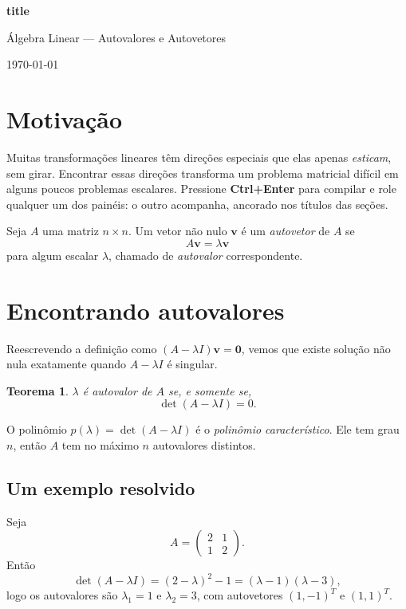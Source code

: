 \documentclass[11pt,a4paper]{article}
\theoremstyle{plain}
\newtheorem{theorem}{Teorema}[section]
\theoremstyle{remark}
\newcommand{\notesTitle}[2]{%
    \noindent{\color{accent}\rule{\linewidth}{3pt}}\par
    \vspace{1.2em}
    \begin{center}
        {\color{accentDark}\LARGE\bfseries #1}\par
        \vspace{0.5em}
        {\color{accent}\large #2}\par
        \vspace{0.4em}
        {\small \today}
    \end{center}
    \vspace{0.6em}
    \noindent{\color{accent}\rule{\linewidth}{1pt}}\par
    \vspace{1.5em}
}
\begin{document}
\notesTitle{{{title}}}{Álgebra Linear --- Autovalores e Autovetores}

\section{Motivação}

Muitas transformações lineares têm direções especiais que elas apenas \emph{esticam}, sem girar. Encontrar essas direções transforma um problema matricial difícil em alguns poucos problemas escalares. Pressione \textbf{Ctrl+Enter} para compilar e role qualquer um dos painéis: o outro acompanha, ancorado nos títulos das seções.

\begin{tcolorbox}[definitionBox, title=Definição 1.1]
Seja $A$ uma matriz $n \times n$. Um vetor não nulo $\mathbf{v}$ é um \emph{autovetor} de $A$ se
\[ A\mathbf{v} = \lambda \mathbf{v} \]
para algum escalar $\lambda$, chamado de \emph{autovalor} correspondente.
\end{tcolorbox}

\section{Encontrando autovalores}

Reescrevendo a definição como $(A - \lambda I)\mathbf{v} = \mathbf{0}$, vemos que existe solução não nula exatamente quando $A - \lambda I$ é singular.

\begin{theorem}
$\lambda$ é autovalor de $A$ se, e somente se,
\[ \det(A - \lambda I) = 0. \]
\end{theorem}

\begin{tcolorbox}[noteBox, title=Observação]
O polinômio $p(\lambda) = \det(A - \lambda I)$ é o \emph{polinômio característico}. Ele tem grau $n$, então $A$ tem no máximo $n$ autovalores distintos.
\end{tcolorbox}

\subsection{Um exemplo resolvido}

\begin{tcolorbox}[exampleBox, title=Exemplo 2.1]
Seja
\[ A = \begin{pmatrix} 2 & 1 \\ 1 & 2 \end{pmatrix}. \]
Então
\[ \det(A - \lambda I) = (2-\lambda)^2 - 1 = (\lambda - 1)(\lambda - 3), \]
logo os autovalores são $\lambda_1 = 1$ e $\lambda_2 = 3$, com autovetores $(1,-1)^{T}$ e $(1,1)^{T}$.
\end{tcolorbox}
\end{document}
